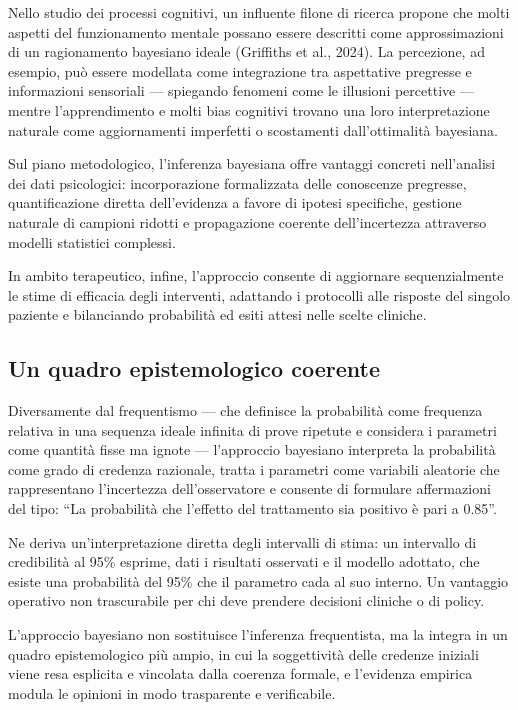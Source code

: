 \documentclass[
  italian,
  letterpaper,
  a4paper,
  11pt,
  open=any]{scrbook}
\theoremstyle{plain}
\theoremstyle{definition}
\theoremstyle{definition}
\theoremstyle{remark}
\begin{document}
Nello studio dei processi cognitivi, un influente filone di ricerca
propone che molti aspetti del funzionamento mentale possano essere
descritti come approssimazioni di un ragionamento bayesiano ideale
(Griffiths et al., 2024). La percezione, ad esempio, può essere
modellata come integrazione tra aspettative pregresse e informazioni
sensoriali --- spiegando fenomeni come le illusioni percettive ---
mentre l'apprendimento e molti bias cognitivi trovano una loro
interpretazione naturale come aggiornamenti imperfetti o scostamenti
dall'ottimalità bayesiana.

Sul piano metodologico, l'inferenza bayesiana offre vantaggi concreti
nell'analisi dei dati psicologici: incorporazione formalizzata delle
conoscenze pregresse, quantificazione diretta dell'evidenza a favore di
ipotesi specifiche, gestione naturale di campioni ridotti e propagazione
coerente dell'incertezza attraverso modelli statistici complessi.

In ambito terapeutico, infine, l'approccio consente di aggiornare
sequenzialmente le stime di efficacia degli interventi, adattando i
protocolli alle risposte del singolo paziente e bilanciando probabilità
ed esiti attesi nelle scelte cliniche.

\subsection{Un quadro epistemologico
coerente}\label{un-quadro-epistemologico-coerente}

Diversamente dal frequentismo --- che definisce la probabilità come
frequenza relativa in una sequenza ideale infinita di prove ripetute e
considera i parametri come quantità fisse ma ignote --- l'approccio
bayesiano interpreta la probabilità come grado di credenza razionale,
tratta i parametri come variabili aleatorie che rappresentano
l'incertezza dell'osservatore e consente di formulare affermazioni del
tipo: ``La probabilità che l'effetto del trattamento sia positivo è pari
a 0.85''.

Ne deriva un'interpretazione diretta degli intervalli di stima: un
intervallo di credibilità al 95\% esprime, dati i risultati osservati e
il modello adottato, che esiste una probabilità del 95\% che il
parametro cada al suo interno. Un vantaggio operativo non trascurabile
per chi deve prendere decisioni cliniche o di policy.

L'approccio bayesiano non sostituisce l'inferenza frequentista, ma la
integra in un quadro epistemologico più ampio, in cui la soggettività
delle credenze iniziali viene resa esplicita e vincolata dalla coerenza
formale, e l'evidenza empirica modula le opinioni in modo trasparente e
verificabile.
\end{document}
